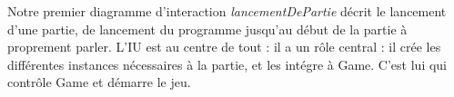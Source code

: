 	Notre premier diagramme d'interaction \textit{lancementDePartie} décrit le lancement d'une partie, de lancement du programme jusqu'au début de la partie à proprement parler.
	L'IU est au centre de tout : il a un rôle central : il crée les différentes instances nécessaires à la partie, et les intégre à Game.
	C'est lui qui contrôle Game et démarre le jeu.







































